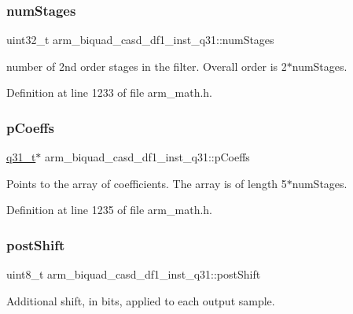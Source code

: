 \subsubsection{\texorpdfstring{num\+Stages}{numStages}}
{\footnotesize\ttfamily uint32\+\_\+t arm\+\_\+biquad\+\_\+casd\+\_\+df1\+\_\+inst\+\_\+q31\+::num\+Stages}

number of 2nd order stages in the filter. Overall order is 2$\ast$num\+Stages. 

Definition at line 1233 of file arm\+\_\+math.\+h.

\mbox{\label{structarm__biquad__casd__df1__inst__q31_aa62366c632f3b5305086f841f079dbd2}} 
\subsubsection{\texorpdfstring{p\+Coeffs}{pCoeffs}}
{\footnotesize\ttfamily \hyperlink{arm__math_8h_adc89a3547f5324b7b3b95adec3806bc0}{q31\+\_\+t}$\ast$ arm\+\_\+biquad\+\_\+casd\+\_\+df1\+\_\+inst\+\_\+q31\+::p\+Coeffs}

Points to the array of coefficients. The array is of length 5$\ast$num\+Stages. 

Definition at line 1235 of file arm\+\_\+math.\+h.

\mbox{\label{structarm__biquad__casd__df1__inst__q31_a636c7fbe09ec4bef0bc0a4b4e2151cbe}} 
\subsubsection{\texorpdfstring{post\+Shift}{postShift}}
{\footnotesize\ttfamily uint8\+\_\+t arm\+\_\+biquad\+\_\+casd\+\_\+df1\+\_\+inst\+\_\+q31\+::post\+Shift}

Additional shift, in bits, applied to each output sample. 


